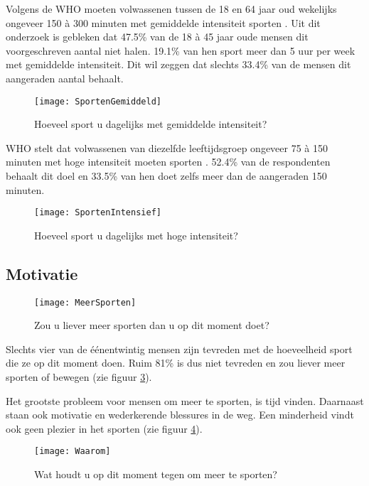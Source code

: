 Volgens de WHO moeten volwassenen tussen de 18 en 64 jaar oud wekelijks ongeveer 150 à 300 minuten met gemiddelde intensiteit sporten \autocite{Bull2020}.
Uit dit onderzoek is gebleken dat 47.5\% van de 18 à 45 jaar oude mensen dit voorgeschreven aantal niet halen. 19.1\% van hen sport meer dan 5 uur per week met gemiddelde intensiteit. Dit wil zeggen dat slechts 33.4\% van de mensen dit aangeraden aantal behaalt.

\begin{figure}[h]
    \caption[Hoeveel sport u dagelijks met gemiddelde intensiteit?]{Hoeveel sport u dagelijks met gemiddelde intensiteit?}
    \texttt{[image: SportenGemiddeld]}
    \label{fig:gemiddeldSporten}
\end{figure}


WHO stelt dat volwassenen van diezelfde leeftijdsgroep ongeveer 75 à 150 minuten met hoge intensiteit moeten sporten \autocite{Bull2020}.
52.4\% van de respondenten behaalt dit doel en 33.5\% van hen doet zelfs meer dan de aangeraden 150 minuten.

\begin{figure}[h]
    \caption[Hoeveel sport u dagelijks met hoge intensiteit?]{Hoeveel sport u dagelijks met hoge intensiteit?}
    \texttt{[image: SportenIntensief]}
    \label{fig:intensiefSporten}
\end{figure}


\subsection{Motivatie}

\begin{figure}[h]
    \caption[Zou u liever meer sporten dan u op dit moment doet?]{Zou u liever meer sporten dan u op dit moment doet?}
    \texttt{[image: MeerSporten]}
    \label{fig:meerBewegen}
\end{figure}

Slechts vier van de éénentwintig mensen zijn tevreden met de hoeveelheid sport die ze op dit moment doen. Ruim 81\% is dus niet tevreden en zou liever meer sporten of bewegen (zie figuur \ref{fig:meerBewegen}).

Het grootste probleem voor mensen om meer te sporten, is tijd vinden. Daarnaast staan ook motivatie en wederkerende blessures in de weg. Een minderheid vindt ook geen plezier in het sporten (zie figuur \ref{fig:waarom}).

\begin{figure}[h]
    \caption[Wat houdt u op dit moment tegen om meer te sporten?]{Wat houdt u op dit moment tegen om meer te sporten?}
    \texttt{[image: Waarom]}
    \label{fig:waarom}
\end{figure}

